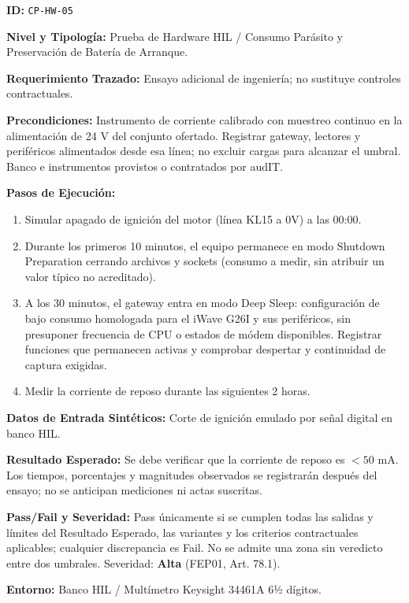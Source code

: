 \par\noindent \textbf{ID:} \texttt{CP-\allowbreak{}HW-\allowbreak{}05}\par
\par\noindent \textbf{Nivel y Tipología:} Prueba de Hardware HIL / Consumo Parásito y Preservación de Batería de Arranque.\par
\par\noindent \textbf{Requerimiento Trazado:} Ensayo adicional de ingeniería; no sustituye controles contractuales.\par
\par\noindent \textbf{Precondiciones:} Instrumento de corriente calibrado con muestreo continuo en la alimentación de 24 V del conjunto ofertado. Registrar gateway, lectores y periféricos alimentados desde esa línea; no excluir cargas para alcanzar el umbral. Banco e instrumentos provistos o contratados por audIT.\par
\par\noindent \textbf{Pasos de Ejecución:}\par
\begin{enumerate}
\item Simular apagado de ignición del motor (línea KL15 a 0V) a las 00:00.
\item Durante los primeros 10 minutos, el equipo permanece en modo Shutdown Preparation cerrando archivos y sockets (consumo a medir, sin atribuir un valor típico no acreditado).
\item A los 30 minutos, el gateway entra en modo Deep Sleep: configuración de bajo consumo homologada para el iWave G26I y sus periféricos, sin presuponer frecuencia de CPU o estados de módem disponibles. Registrar funciones que permanecen activas y comprobar despertar y continuidad de captura exigidas.
\item Medir la corriente de reposo durante las siguientes 2 horas.
\end{enumerate}

\par\noindent \textbf{Datos de Entrada Sintéticos:} Corte de ignición emulado por señal digital en banco HIL.\par
\par\noindent \textbf{Resultado Esperado:} Se debe verificar que la corriente de reposo es $< 50\text{ mA}$. Los tiempos, porcentajes y magnitudes observados se registrarán después del ensayo; no se anticipan mediciones ni actas suscritas.\par
\par\noindent \textbf{Pass/Fail y Severidad:} Pass únicamente si se cumplen todas las salidas y límites del Resultado Esperado, las variantes y los criterios contractuales aplicables; cualquier discrepancia es Fail. No se admite una zona sin veredicto entre dos umbrales. Severidad: \textbf{Alta} (FEP01, Art. 78.1).\par
\par\noindent \textbf{Entorno:} Banco HIL / Multímetro Keysight 34461A 6½ dígitos.\par




